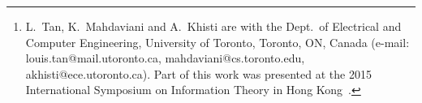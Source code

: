 \documentclass[journal,onecolumn,12pt,twoside]{IEEEtranTCOM}
\begin{document}
\author{
\thanks{L.~Tan, K.~Mahdaviani and A.~Khisti are with the Dept.\ of Electrical and Computer Engineering, University of Toronto, Toronto, ON, Canada (e-mail: louis.tan@mail.utoronto.ca, mahdaviani@cs.toronto.edu, akhisti@ece.utoronto.ca). 
Part of this work was presented at the 2015 International Symposium on Information Theory in Hong Kong~\cite{TMKS_ISIT15}.}%
}%

\end{document}
